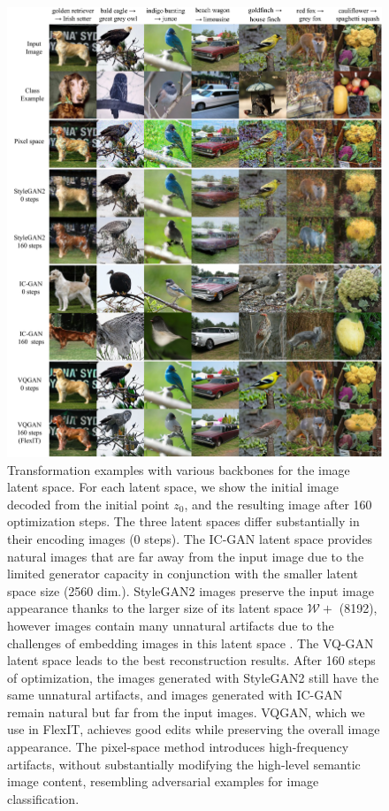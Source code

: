 \begin{figure}[h!]
    \centering
    \includegraphics[width=0.85\linewidth]{images/flexit/assets/encoder2.pdf}
    \caption{Transformation examples with various backbones for the image latent space. For each latent space, we show the initial image decoded from the initial point $z_0$, and the resulting image after 160 optimization steps. 
    The three latent spaces differ substantially in their encoding images (0 steps). The IC-GAN latent space provides natural images that are far away from the input image due to the limited generator capacity in conjunction with the smaller latent space size (2560 dim.). StyleGAN2 images preserve the input image appearance thanks to the larger size of its latent space $\mathcal{W+}$ (8192), however images contain many unnatural artifacts due to the challenges of embedding images in this latent space \cite{tov2021designing}. The VQ-GAN latent space leads to the best  reconstruction results.
    After 160 steps of optimization, the images generated with StyleGAN2 still have the same unnatural artifacts, and images generated with IC-GAN remain natural but  far from the input images.
    VQGAN, which we use in FlexIT, achieves good edits while preserving the overall image appearance.
    The pixel-space method introduces high-frequency artifacts, without substantially modifying the high-level semantic image content, resembling adversarial examples for image classification. }
\label{fig:encoders2}
\end{figure}


